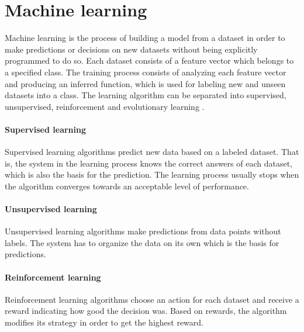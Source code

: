 \documentclass[USenglish]{ifimaster}  %
\begin{document}


\section{Machine learning}
Machine learning is the process of building a model from a dataset in order
to make predictions or decisions on new datasets without being explicitly
programmed to do so. Each dataset consists of a feature vector which
belongs to a specified class. The training process consists of analyzing
each feature vector and producing an inferred function, which is used for
labeling new and unseen datasets into a class. The learning algorithm can be
separated into supervised, unsupervised, reinforcement and evolutionary
learning \cite{Marsland:2009:MLA:1571643}.

\paragraph{Supervised learning}
Supervised learning algorithms predict new data based on a labeled dataset. That is, the system in the learning process knows the correct answers of each dataset, which is also the basis for the prediction. The learning process usually stops when the algorithm
converges towards an acceptable level of performance.

	
\paragraph{Unsupervised learning}
Unsupervised learning algorithms make predictions from data points without labels. The system has to organize the data on its own which is the basis for predictions.

	
\paragraph{Reinforcement learning}
Reinforcement learning algorithms choose an action for each dataset and receive a reward indicating how good the decision was. Based on rewards, the algorithm modifies its strategy in order to get the highest reward.  
	
\end{document}
